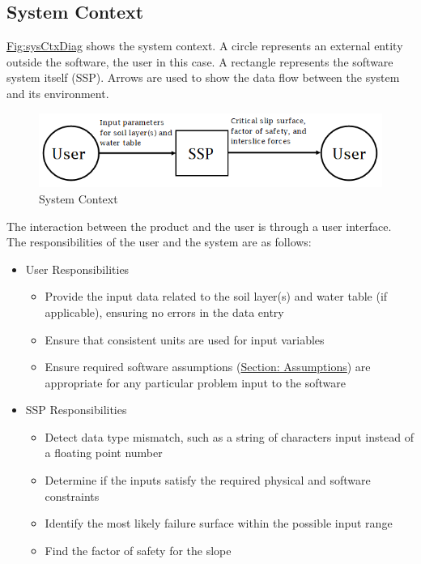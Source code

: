 \documentclass[12pt]{article}
\begin{document}
\subsection{System Context}
\label{Sec:SysContext}
\hyperref[Figure:sysCtxDiag]{Fig:sysCtxDiag} shows the system context. A circle represents an external entity outside the software, the user in this case. A rectangle represents the software system itself (SSP). Arrows are used to show the data flow between the system and its environment.
\begin{figure}
\begin{center}
\includegraphics[width=\textwidth]{../../../datafiles/SSP/SystemContextFigure.png}
\caption{System Context}
\label{Figure:sysCtxDiag}
\end{center}
\end{figure}
The interaction between the product and the user is through a user interface. The responsibilities of the user and the system are as follows:
\begin{itemize}
\item{User Responsibilities}
\begin{itemize}
\item{Provide the input data related to the soil layer(s) and water table (if applicable), ensuring no errors in the data entry}
\item{Ensure that consistent units are used for input variables}
\item{Ensure required software assumptions (\hyperref[Sec:Assumps]{Section: Assumptions}) are appropriate for any particular problem input to the software}
\end{itemize}
\item{SSP Responsibilities}
\begin{itemize}
\item{Detect data type mismatch, such as a string of characters  input instead of a floating point number}
\item{Determine if the inputs satisfy the required physical and software constraints}
\item{Identify the most likely failure surface within the possible input range}
\item{Find the factor of safety for the slope}
\end{itemize}
\end{itemize}
\end{document}
